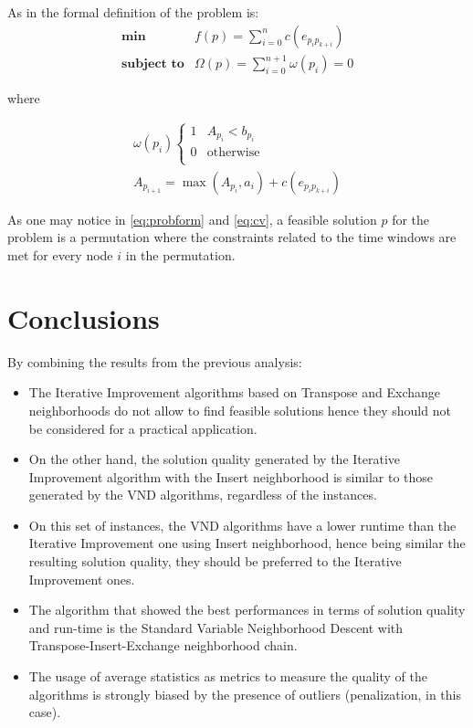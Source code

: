 \documentclass{article}
\begin{document}
As in \cite{lopez2010beam} the formal definition of the problem is:
\begin{equation} \label{eq:probform}
 \begin{array}{rl}
  \textbf{min} & f(p)= \sum\limits_{i=0}^{n} c(e_{p_{i}p_{k+i}}) \\
  \textbf{subject to} & \Omega(p)= \sum\limits_{i=0}^{n+1} \omega(p_{i}) = 0
 \end{array}
\end{equation}

where

\begin{equation} \label{eq:cv}
\begin{array}{c}
 \omega(p_{i}) \begin{cases}
                1 & A_{p_i} < b_{p_i}  \\
                0 & \text{otherwise} \\   
               \end{cases} \\
 A_{p_{i+1}} = \max(A_{p_i},a_i) + c(e_{p_{i}p_{k+i}}) 
\end{array}
\end{equation}

As one may notice in \ref{eq:probform} and \ref{eq:cv}, a feasible solution $p$ for the problem is a permutation where the constraints related to the time windows are met for every node $i$ in the permutation.







\section{Conclusions}
By combining the results from the previous analysis:
\begin{itemize}
  \item The Iterative Improvement algorithms based on Transpose and Exchange neighborhoods do not allow to find feasible solutions hence they should not be considered for a practical application.
  \item On the other hand, the solution quality generated by the Iterative Improvement algorithm with the Insert neighborhood is similar to those generated by the VND algorithms, regardless of the instances.
  \item On this set of instances, the VND algorithms have a lower runtime than the Iterative Improvement one using Insert neighborhood, hence being similar the resulting solution quality, they should be preferred to the Iterative Improvement ones.
  \item The algorithm that showed the best performances in terms of solution quality and run-time is the Standard Variable Neighborhood Descent with Transpose-Insert-Exchange neighborhood chain.
  \item The usage of average statistics as metrics to measure the quality of the algorithms is strongly biased by the presence of outliers (penalization, in this case).
\end{itemize}





\end{document}
